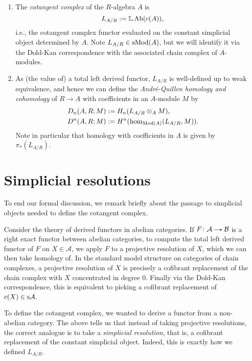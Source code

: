 \begin{definitions}
  \begin{enumerate}[leftmargin=*]
  \item The \emph{cotangent complex} of the $R$-algebra
    $A$ is
    \[
    L_{A/R} \mathrel{:=} \mathbb{L}\operatorname{Ab}(c(A)),
    \]
    i.e., the cotangent complex functor evaluated on the constant
    simplicial object determined by $A$. Note $L_{A/R} \in
    \mathrm{s}\mathrm{Mod}(A)$, but we will identify it via the Dold-Kan
    correspondence with the associated chain complex of $A$-modules.
  \item As (the value of) a total left derived functor, $L_{A/R}$
    is well-defined up to weak equivalence, and hence we can define
    the \emph{Andr\'e-Quillen homology and cohomology} of $R \to A$
    with coefficients in an $A$-module $M$ by
    \begin{align*}
      D_n(A,R;M) &\mathrel{:=} H_n(L_{A/R} \otimes_A M),\\ D^n(A,R;M)
      &\mathrel{:=} H^n(\hom_{\mathrm{Mod}(A)}(L_{A/R}, M)).
    \end{align*}
    Note in particular that homology with coefficients in $A$ is given
    by $\pi_*(L_{A/R})$.
  \end{enumerate}
\end{definitions}


\section{Simplicial resolutions}

To end our formal discussion, we remark briefly about the passage to
simplicial objects needed to define the cotangent complex.

\renewcommand{\A}{\mathcal{A}}
\renewcommand{\B}{\mathcal{B}}

Consider the theory of derived functors in abelian categories. If $F
\c \A \to \B$ is a right exact functor between abelian categories, to
compute the total left derived functor of $F$ on $X \in \A$, we apply
$F$ to a projective resolution of $X$, which we can then take homology
of. In the standard model structure on categories of chain complexes,
a projective resolution of $X$ is precisely a cofibrant replacement of
the chain complex with $X$ concentrated in degree $0$. Finally via the
Dold-Kan correspondence, this is equivalent to picking a cofibrant
replacement of $c(X) \in \s\A$.

To define the cotangent complex, we wanted to derive a functor from a
non-abelian category. The above tells us that instead of taking
projective resolutions, the correct analogue is to take a
\emph{simplicial resolution}, that is, a cofibrant replacement of the
constant simplicial object. Indeed, this is exactly how we defined
$L_{A/R}$.

